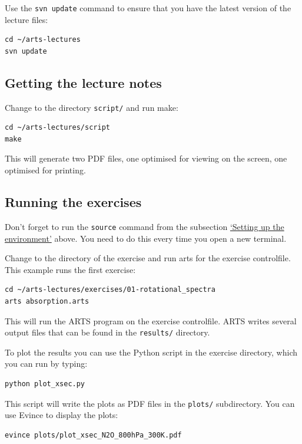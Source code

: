 Use the \verb|svn update| command to ensure that you have the latest version
of the lecture files:

\begin{verbatim}
cd ~/arts-lectures
svn update
\end{verbatim}

\subsection*{Getting the lecture notes}

Change to the directory \texttt{script/} and run make:

\begin{verbatim}
cd ~/arts-lectures/script
make
\end{verbatim}

This will generate two PDF files, one optimised for viewing on the screen, one
optimised for printing.

\subsection*{Running the exercises}

Don't forget to run the \verb|source| command from the subsection
\hyperref[sec:setup-env]{`Setting up the environment'} above. You need to do
this every time you open a new terminal.

Change to the directory of the exercise and run arts for the exercise
controlfile. This example runs the first exercise:

\begin{verbatim}
cd ~/arts-lectures/exercises/01-rotational_spectra
arts absorption.arts
\end{verbatim}

This will run the ARTS program on the exercise controlfile. ARTS writes
several output files that can be found in the \texttt{results/} directory.

To plot the results you can use the Python script in the exercise directory,
which you can run by typing:

\begin{verbatim}
python plot_xsec.py
\end{verbatim}

This script will write the plots as PDF files in the \texttt{plots/}
subdirectory. You can use Evince to display the plots:

\begin{verbatim}
evince plots/plot_xsec_N2O_800hPa_300K.pdf
\end{verbatim}



